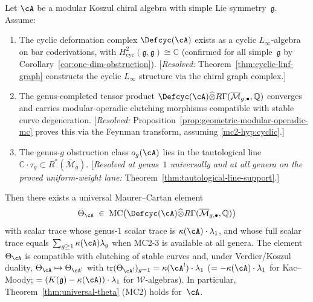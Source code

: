 \begin{theorem}
\label{thm:mc2-conditional-completion}
Let $\cA$ be a modular Koszul chiral algebra with simple Lie
symmetry~$\mathfrak{g}$.  Assume:
\begin{enumerate}[label=\textup{(MC2-\arabic*)}]
\item\label{mc2-hyp:cyclic}
  The cyclic deformation complex $\Defcyc(\cA)$ exists as a cyclic
  $L_\infty$-algebra on bar coderivations, with
  $H^2_{\mathrm{cyc}}(\mathfrak{g},\mathfrak{g}) \cong \mathbb{C}$
  \textup{(}confirmed for all simple~$\mathfrak{g}$ by
  Corollary~\textup{\ref{cor:one-dim-obstruction}}\textup{)}.
  \textup{[}\emph{Resolved:}
  Theorem~\textup{\ref{thm:cyclic-linf-graph}} constructs the
  cyclic $L_\infty$ structure via the chiral graph complex.\textup{]}
\item\label{mc2-hyp:completion}
  The genus-completed tensor product
  $\Defcyc(\cA) \widehat{\otimes}
  R\Gamma(\overline{\mathcal{M}}_{g,\bullet}, \mathbb{Q})$
  converges and carries modular-operadic clutching morphisms
  compatible with stable curve degeneration.
  \textup{[}\emph{Resolved:}
  Proposition~\textup{\ref{prop:geometric-modular-operadic-mc}}
  proves this via the Feynman transform, assuming
  \textup{\ref{mc2-hyp:cyclic}}.\textup{]}
\item\label{mc2-hyp:tautological}
  The genus-$g$ obstruction class $o_g(\cA)$ lies in the
  tautological line
  $\mathbb{C} \cdot \tau_g \subset R^*(\overline{\mathcal{M}}_g)$.
  \textup{[}\emph{Resolved at genus~$1$ universally and at all
  genera on the proved uniform-weight lane:}
  Theorem~\textup{\ref{thm:tautological-line-support}}.\textup{]}
\end{enumerate}
Then there exists a universal Maurer--Cartan element
\[
  \Theta_{\cA}
  \;\in\;
  \mathrm{MC}\bigl(
    \Defcyc(\cA) \widehat{\otimes}
    R\Gamma(\overline{\mathcal{M}}_{g,\bullet}, \mathbb{Q})
  \bigr)
\]
with scalar trace
whose genus-$1$ scalar trace is
$\kappa(\cA) \cdot \lambda_1$, and whose full scalar trace equals
$\sum_{g\ge1}\kappa(\cA)\lambda_g$ when MC2-3 is available at all
genera.
The element $\Theta_{\cA}$ is compatible with clutching of stable
curves and, under Verdier/Koszul duality,
$\Theta_{\cA} \mapsto \Theta_{\cA^!}$ with
$\operatorname{tr}(\Theta_{\cA^!})_{g=1}
= \kappa(\cA^!) \cdot \lambda_1$
\textup{(}$= -\kappa(\cA) \cdot \lambda_1$ for Kac--Moody;
$= (K(\mathfrak{g}) - \kappa(\cA)) \cdot \lambda_1$ for
$\mathcal{W}$-algebras\textup{)}.
In particular, Theorem~\ref{thm:universal-theta}
\textup{(MC2)} holds for~$\cA$.
\end{theorem}

